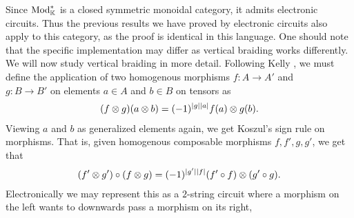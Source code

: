 \documentclass[../thesis.tex]{subfiles}
\begin{document}
            Since $\tt{Mod}_\mathbb{K}^*$ is a closed symmetric monoidal category, it admits electronic circuits. Thus the previous results we have proved by electronic circuits also apply to this category, as the proof is identical in this language. One should note that the specific implementation may differ as vertical braiding works differently. We will now study vertical braiding in more detail. Following Kelly \cite{Kelly05}, we must define the application of two homogenous morphisms $f : A \rightarrow A'$ and \\ $g : B \rightarrow B'$ on elements $a \in A$ and $b\in B$ on tensors as
            \begin{align*}
                (f\otimes g)(a\otimes b) = (-1)^{|g||a|}f(a)\otimes g(b)\tt{.}
            \end{align*}
            Viewing $a$ and $b$ as generalized elements again, we get Koszul's sign rule on morphisms. That is, given homogenous composable morphisms $f, f', g, g'$, we get that
            \begin{align*}
                (f' \otimes g')\circ(f\otimes g) = (-1)^{|g'||f|}(f'\circ f)\otimes (g'\circ g)\tt{.}
            \end{align*}
            Electronically we may represent this as a $2$-string circuit where a morphism on the left wants to downwards pass a morphism on its right,
            \begin{center}
            \end{center}
\end{document}
